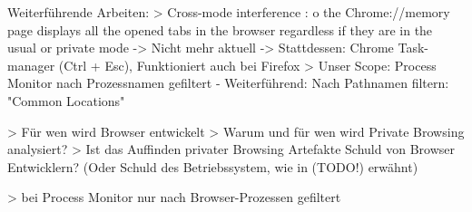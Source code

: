 Weiterführende Arbeiten:
> Cross-mode interference \cite{Hedberg.2013}:
	o	the Chrome://memory page displays all the opened tabs in the browser regardless if they are in the usual or private mode -> Nicht mehr aktuell -> Stattdessen: Chrome Task-manager (Ctrl + Esc), Funktioniert auch bei Firefox
> Unser Scope: Process Monitor nach Prozessnamen gefiltert
	- Weiterführend: Nach Pathnamen filtern: "Common Locations"

> Für wen wird Browser entwickelt
> Warum und für wen wird Private Browsing analysiert?
> Ist das Auffinden privater Browsing Artefakte Schuld von Browser Entwicklern? (Oder Schuld des Betriebssystem, wie in (TODO!) erwähnt)

> bei Process Monitor nur nach Browser-Prozessen gefiltert


